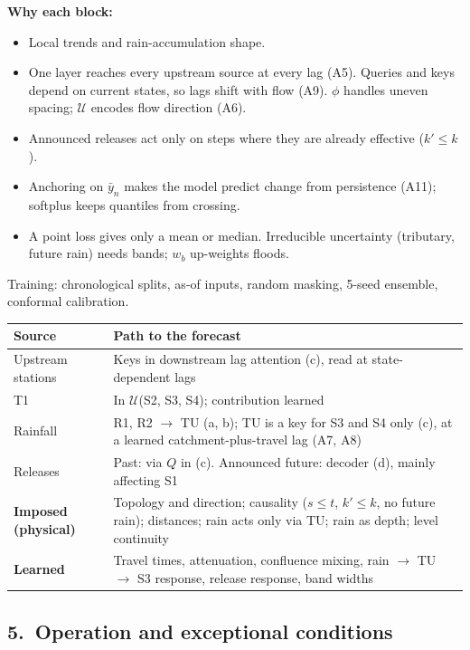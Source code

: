 \documentclass[11pt, a4paper]{article}
\begin{document}
\noindent\textbf{Why each block:}
\begin{itemize}[leftmargin=*, itemsep=0pt]
  \item[(b)] Local trends and rain-accumulation shape.
  \item[(c)] One layer reaches every upstream source at every lag (A5). Queries and keys depend on current states, so lags shift with flow (A9). $\phi$ handles uneven spacing; $\mathcal U$ encodes flow direction (A6).
  \item[(d)] Announced releases act only on steps where they are already effective ($k'\le k$).
  \item[(e)] Anchoring on $\bar y_n$ makes the model predict change from persistence (A11); softplus keeps quantiles from crossing.
  \item[(f)] A point loss gives only a mean or median. Irreducible uncertainty (tributary, future rain) needs bands; $w_b$ up-weights floods.
\end{itemize}
Training: chronological splits, as-of inputs, random masking, 5-seed ensemble, conformal calibration.

\begin{center}\small
\begin{tabularx}{\textwidth}{@{}l X@{}}
\toprule
Source & Path to the forecast\\
\midrule
Upstream stations & Keys in downstream lag attention (c), read at state-dependent lags\\
T1 & In $\mathcal U$(S2, S3, S4); contribution learned\\
Rainfall & R1, R2 $\to$ TU (a, b); TU is a key for S3 and S4 only (c), at a learned catchment-plus-travel lag (A7, A8)\\
Releases & Past: via $Q$ in (c). Announced future: decoder (d), mainly affecting S1\\
\midrule
\textbf{Imposed (physical)} & Topology and direction; causality ($s{\le}t$, $k'{\le}k$, no future rain); distances; rain acts only via TU; rain as depth; level continuity\\
\textbf{Learned} & Travel times, attenuation, confluence mixing, rain $\to$ TU $\to$ S3 response, release response, band widths\\
\bottomrule
\end{tabularx}
\end{center}

\subsection*{5.\ Operation and exceptional conditions}
\end{document}
